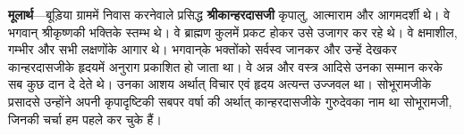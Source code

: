 \begin{sloppypar}\justifying{}
\textbf{मूलार्थ}—बूड़िया ग्राममें निवास करनेवाले प्रसिद्ध \textbf{श्रीकान्हरदासजी} कृपालु, आत्माराम और आगमदर्शी थे। वे भगवान् श्रीकृष्णकी भक्तिके स्तम्भ थे। वे ब्राह्मण कुलमें प्रकट होकर उसे उजागर कर रहे थे। वे क्षमाशील, गम्भीर और सभी लक्षणोंके आगार थे। भगवान्‌के भक्तोंको सर्वस्व जानकर और उन्हें देखकर कान्हरदासजीके हृदयमें अनुराग प्रकाशित हो जाता था। वे अन्न और वस्त्र आदिसे उनका सम्मान करके सब कुछ दान दे देते थे। उनका आशय अर्थात् विचार एवं हृदय अत्यन्त उज्जवल था। सोभूरामजीके प्रसादसे उन्होंने अपनी कृपादृष्टिकी सबपर वर्षा की अर्थात् कान्हरदासजीके गुरुदेवका नाम था सोभूरामजी, जिनकी चर्चा हम पहले कर चुके हैं।
\end{sloppypar}


